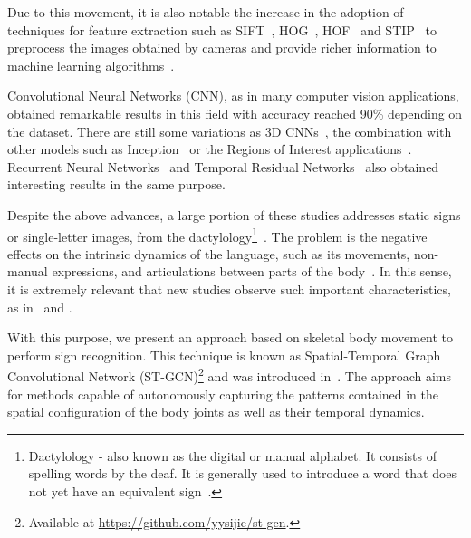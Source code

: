 Due to this movement, it is also notable the increase in the adoption of techniques for feature extraction such as SIFT~\cite{lowe-2004}, HOG~\cite{dalal-2005}, HOF~\cite{laptev-2008} and STIP~\cite{laptev-2008} to preprocess the images obtained by cameras and provide richer information to machine learning algorithms~\cite{lim-2016,shanta-2018}.

Convolutional Neural Networks (CNN), as in many computer vision applications, obtained remarkable results in this field with accuracy reached 90\% \cite{shanta-2018,ji-2017,taskiran-2018,rao-2018} depending on the dataset. There are still some variations as 3D CNNs~\cite{elbadawy-2017}, the combination with other models such as Inception~\cite{das-2018} or the Regions of Interest applications~\cite{sajanraj-2018}. Recurrent Neural Networks~\cite{konstantinidis-2018} and Temporal Residual Networks~\cite{pigou-2017} also obtained interesting results in the same purpose.

Despite the above advances, a large portion of these studies addresses static signs or single-letter images, from the dactylology\footnote{Dactylology - also known as the digital or manual alphabet. It consists of spelling words by the deaf. It is generally used to introduce a word that does not yet have an equivalent sign~\cite{quadros-2004,pereira-choi-2011}.
}~\cite{shanta-2018,taskiran-2018,elbadawy-2017,das-2018,sajanraj-2018}. The problem is the negative effects on the intrinsic dynamics of the language, such as its movements, non-manual expressions, and articulations between parts of the body~\cite{quadros-2004}. In this sense, it is extremely relevant that new studies observe such important characteristics, as in~\cite{konstantinidis-2018} and \cite {pigou-2017}.

With this purpose, we present an approach based on skeletal body movement to perform sign recognition. This technique is known as Spatial-Temporal Graph Convolutional Network (ST-GCN)\footnote {Available at \url{https://github.com/yysijie/st-gcn}.} and was introduced in~\cite{st-gcn-2018}. The approach aims for methods capable of autonomously capturing the patterns contained in the spatial configuration of the body joints as well as their temporal dynamics. %

